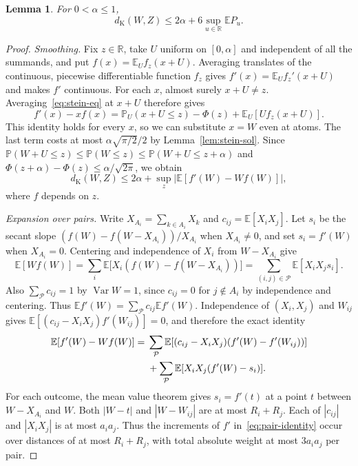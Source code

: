 \documentclass[11pt,a4paper]{article}
\newtheorem{lemma}[theorem]{Lemma}
\newcommand{\E}{\mathbb E}
\newcommand{\PP}{\mathbb P}
\newcommand{\R}{\mathbb R}
\newcommand{\Var}{\operatorname{Var}}
\newcommand{\dK}{d_{\mathrm K}}
\newcommand{\pairs}{\mathcal P}
\begin{document}
\begin{lemma}\label{lem:stein}
For $0<\alpha\le1$,
\[
 \dK(W,Z)\le 2\alpha+6\sup_{u\in\R}\E P_u .
\]
\end{lemma}
\begin{proof}
\emph{Smoothing.}
Fix $z\in\R$, take $U$ uniform on $[0,\alpha]$ and independent of all
the summands, and put $f(x)=\E_U f_z(x+U)$. Averaging translates of the
continuous, piecewise differentiable function $f_z$ gives
$f'(x)=\E_U f_z'(x+U)$ and makes $f'$ continuous. For each $x$, almost
surely $x+U\ne z$. Averaging~\eqref{eq:stein-eq} at $x+U$ therefore gives
\[
 f'(x)-xf(x)=\PP_U(x+U\le z)-\Phi(z)+\E_U[Uf_z(x+U)] .
\]
This identity holds for every $x$, so we can substitute $x=W$ even at
atoms. The last term costs at most $\alpha\sqrt{\pi/2}/2$ by
Lemma~\ref{lem:stein-sol}. Since
$\PP(W+U\le z)\le\PP(W\le z)\le\PP(W+U\le z+\alpha)$ and
$\Phi(z+\alpha)-\Phi(z)\le\alpha/\sqrt{2\pi}$, we obtain
\[
 \dK(W,Z)\le 2\alpha+\sup_z\big|\E[f'(W)-Wf(W)]\big|,
\]
where $f$ depends on $z$.

\emph{Expansion over pairs.}
Write $X_{A_i}=\sum_{k\in A_i}X_k$ and $c_{ij}=\E[X_iX_j]$. Let $s_i$ be the
secant slope $(f(W)-f(W-X_{A_i}))/X_{A_i}$ when $X_{A_i}\ne0$, and set $s_i=f'(W)$
when $X_{A_i}=0$. Centering and independence of $X_i$ from $W-X_{A_i}$ give
\[
 \E[Wf(W)]=\sum_i\E\big[X_i(f(W)-f(W-X_{A_i}))\big]
           =\sum_{(i,j)\in\pairs}\E[X_iX_j s_i].
\]
Also $\sum_{\pairs}c_{ij}=1$ by $\Var W=1$, since $c_{ij}=0$ for
$j\notin A_i$ by independence and centering. Thus
$\E f'(W)=\sum_{\pairs}c_{ij}\E f'(W)$. Independence of $(X_i,X_j)$ and $W_{ij}$ gives
$\E[(c_{ij}-X_iX_j)f'(W_{ij})]=0$, and therefore the exact identity
\begin{align}
 \E[f'(W)-Wf(W)]={}&
 \sum_{\pairs}\E[(c_{ij}-X_iX_j)(f'(W)-f'(W_{ij}))]\notag\\
 &+\sum_{\pairs}\E[X_iX_j(f'(W)-s_i)] .\label{eq:pair-identity}
\end{align}
For each outcome, the mean value theorem gives $s_i=f'(t)$ at a point $t$
between $W-X_{A_i}$ and $W$. Both $|W-t|$ and $|W-W_{ij}|$ are at most $R_i+R_j$.
Each of $|c_{ij}|$ and $|X_iX_j|$ is at most $a_i a_j$.
Thus the increments of $f'$ in~\eqref{eq:pair-identity} occur over
distances of at most $R_i+R_j$, with total absolute weight at most
$3a_i a_j$ per pair.


\end{proof}
\end{document}
